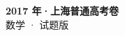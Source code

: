 \documentclass[zihao=-4, a4paper]{ctexart}
\begin{document}
\begin{center}
  {\Large\bfseries 2017 年·上海普通高考卷}\\[4pt]
  {\large 数学 · 试题版}
\end{center}
\medskip
{}

\end{document}
